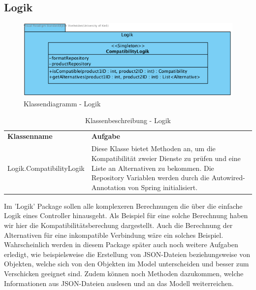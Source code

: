 \FloatBarrier
\subsection{Logik}
\begin{figure}[h]
	\centering
	\includegraphics[width=\textwidth]{klassendiagramm/Logik}
	\caption{Klassendiagramm - Logik}
	\label{fig:klassendiagramm-logik}
\end{figure}
\begin{table}[h]
	\centering
	\begin{tabularx}{\textwidth}{X X}
		\rowcolor[HTML]{C0C0C0}
		\textbf{Klassenname} & \textbf{Aufgabe} \\
		Logik.CompatibilityLogik & Diese Klasse bietet Methoden an, um die Kompatibilität zweier Dienste zu prüfen und eine Liste an Alternativen zu bekommen. Die Repository Variablen werden durch die Autowired-Annotation von Spring initialisiert. \\
	\end{tabularx}
	\caption{Klassenbeschreibung - Logik}
	\label{table:klassenbeschreibung-logik}
\end{table}
\FloatBarrier

Im 'Logik' Package sollen alle komplexeren Berechnungen die über die einfache Logik eines Controller hinausgeht.
Als Beispiel für eine solche Berechnung haben wir hier die Kompatibilitätsberechung dargestellt.
Auch die Berechnung der Alternativen für eine inkompatible Verbindung wäre ein solches Beispiel.
Wahrscheinlich werden in diesem Package später auch noch weitere Aufgaben erledigt, wie beispielsweise die Erstellung von JSON-Dateien beziehungsweise von Objekten, welche sich von den Objekten im Model unterscheiden und besser zum Verschicken geeignet sind.
Zudem können noch Methoden dazukommen, welche Informationen aus JSON-Dateien auslesen und an das Modell weiterreichen.



\newpage

